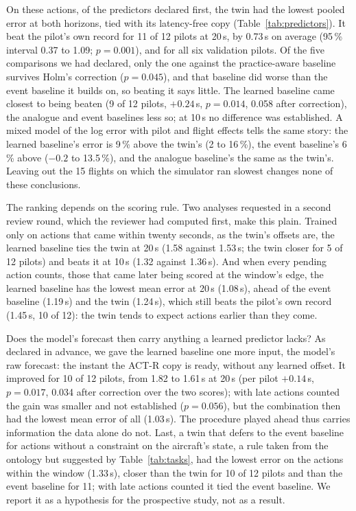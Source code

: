 \documentclass{llncs}
\begin{document}
On these actions, of the predictors declared first, the twin had the lowest pooled error at both horizons, tied with its latency-free
copy (Table~\ref{tab:predictors}).
It beat the pilot's own record for 11 of 12 pilots at 20\,s, by 0.73\,s on average (95\,\% interval 0.37 to 1.09; $p = 0.001$), and for
all six validation pilots. Of the five comparisons we had declared, only the one against the practice-aware baseline survives Holm's
correction ($p = 0.045$), and that baseline did worse than the event baseline it builds on, so beating it says little. The learned
baseline came closest to being beaten (9 of 12 pilots, $+0.24$\,s, $p = 0.014$, 0.058 after correction), the analogue and event
baselines less so; at 10\,s no difference was established. A mixed model of the log error with pilot and flight effects tells the same
story: the learned baseline's error is 9\,\% above the twin's (2 to 16\,\%), the event baseline's 6\,\% above ($-0.2$ to 13.5\,\%), and
the analogue baseline's the same as the twin's. Leaving out the 15 flights on which the simulator ran slowest changes none of these
conclusions.

The ranking depends on the scoring rule. Two analyses requested in a second review round, which the reviewer had computed first, make
this plain. Trained only on actions that came within twenty seconds, as the twin's offsets are, the learned baseline ties the twin at
20\,s (1.58 against 1.53\,s; the twin closer for 5 of 12 pilots) and beats it at 10\,s (1.32 against 1.36\,s). And when every pending
action counts, those that came later being scored at the window's edge, the learned baseline has the lowest mean error at 20\,s
(1.08\,s), ahead of the event baseline (1.19\,s) and the twin (1.24\,s), which still beats the pilot's own record (1.45\,s, 10 of 12):
the twin tends to expect actions earlier than they come.

Does the model's forecast then carry anything a learned predictor lacks? As declared in advance, we gave the learned baseline one more
input, the model's raw forecast: the instant the ACT-R copy is ready, without any learned offset. It improved for 10 of 12 pilots, from
1.82 to 1.61\,s at 20\,s (per pilot $+0.14$\,s, $p = 0.017$, 0.034 after correction over the two scores); with late actions counted the
gain was smaller and not established ($p = 0.056$), but the combination then had the lowest mean error of all (1.03\,s). The procedure
played ahead thus carries information the data alone do not. Last, a twin that defers to the event baseline for actions without a
constraint on the aircraft's state, a rule taken from the ontology but suggested by Table~\ref{tab:tasks}, had the lowest error on the
actions within the window (1.33\,s), closer than the twin for 10 of 12 pilots and than the event baseline for 11; with late actions
counted it tied the event baseline. We report it as a hypothesis for the prospective study, not as a result.
\end{document}
